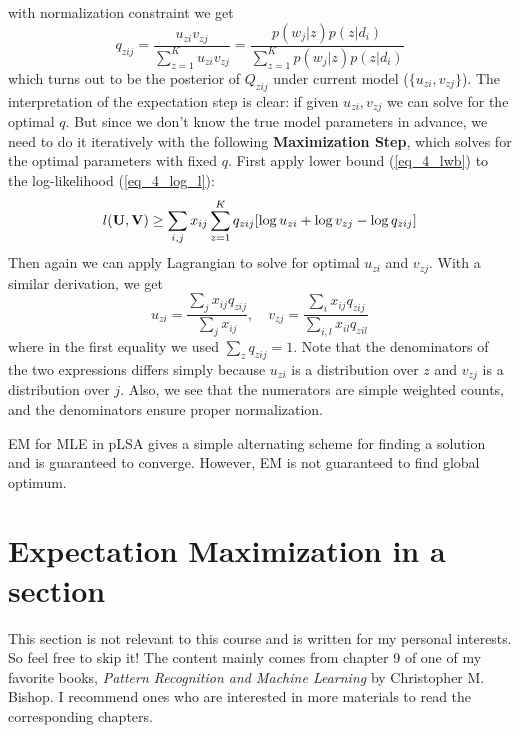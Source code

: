 \documentclass[../book-template.tex]{subfiles}
\begin{document}
with normalization constraint we get
\begin{equation*}
	q_{zij} = \frac{u_{zi}v_{zj}}{\sum_{z=1}^{K}u_{zi}v_{zj}} = \frac{p(w_j|z)p(z|d_i)}{\sum_{z=1}^{K}p(w_j|z)p(z|d_i)}
\end{equation*}
which turns out to be the posterior of $Q_{zij}$ under current model ($\{u_{zi},v_{zj}\}$). The interpretation of the expectation step is clear: if given $u_{zi},v_{zj}$ we can solve for the optimal $q$. But since we don't know the true model parameters in advance, we need to do it iteratively with the following \textbf{Maximization Step}, which solves for the optimal parameters with fixed $q$. First apply lower bound (\ref{eq_4_lwb}) to the log-likelihood (\ref{eq_4_log_l}):
\begin{equation*}
	l({\bf U},{\bf V}) \geq \sum_{i,j}x_{ij} \sum_{z=1}^{K} q_{zij}[\log u_{zi} + \log v_{zj} - \log q_{zij}]
\end{equation*}
Then again we can apply Lagrangian to solve for optimal $u_{zi}$ and $v_{zj}$. With a similar derivation, we get
\begin{equation*}
	u_{zi}=\frac{\sum_{j}x_{ij}q_{zij}}{\sum_{j}x_{ij}},\quad v_{zj}=\frac{\sum_{i}x_{ij}q_{zij}}{\sum_{i,l}x_{il}q_{zil}}
\end{equation*}
where in the first equality we used $\sum_{z} q_{zij}=1$. Note that the denominators of the two expressions differs simply because $u_{zi}$ is a distribution over $z$ and $v_{zj}$ is a distribution over $j$. Also, we see that the numerators are simple weighted counts, and the denominators ensure proper normalization.
\par EM for MLE in pLSA gives a simple alternating scheme for finding a solution and is guaranteed to converge. However, EM is not guaranteed to find global optimum.
\section{Expectation Maximization in a section}\label{sec_4_EM}
This section is not relevant to this course and is written for my personal interests. So feel free to skip it! The content mainly comes from chapter 9 of one of my favorite books, \emph{Pattern Recognition and Machine Learning} by Christopher M. Bishop. I recommend ones who are interested in more materials to read the corresponding chapters.
\end{document}

